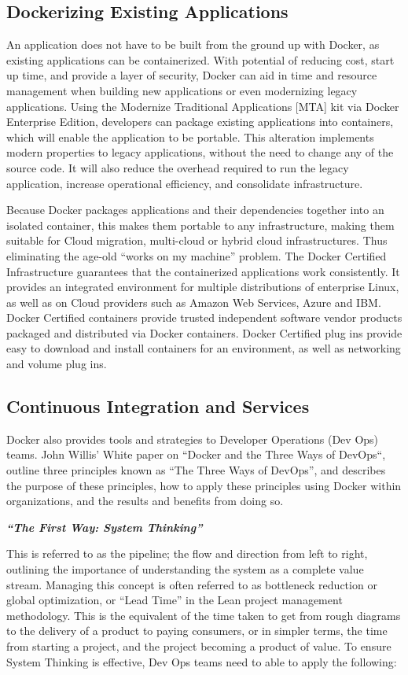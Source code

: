 \subsection{Dockerizing Existing Applications}
An application does not have to be built from the ground up with Docker, as existing applications  can be containerized. With potential of reducing cost, start up time, and provide a layer of security, Docker can aid in time and resource management when building new applications or even modernizing legacy applications. Using the Modernize Traditional Applications [MTA] kit via Docker Enterprise Edition, developers can package existing applications into containers, which will enable the application to be portable. This alteration implements modern properties to legacy applications, without the need to change any of the source code. It will also reduce the overhead required to run the legacy application, increase operational efficiency, and consolidate infrastructure.

Because Docker packages applications and their dependencies together into an isolated container, this makes them portable to any infrastructure, making them suitable for Cloud migration, multi-cloud or hybrid cloud infrastructures. Thus eliminating the age-old “works on my machine” problem. The Docker Certified Infrastructure guarantees that the containerized applications work consistently. It provides an integrated environment for multiple distributions of enterprise Linux, as well as on Cloud providers such as Amazon Web Services, Azure and IBM. Docker Certified containers provide trusted independent software vendor products packaged and distributed via Docker containers. Docker Certified plug ins provide easy to download and install containers for an environment, as well as networking and volume plug ins.

\subsection{Continuous Integration and Services}
Docker also provides tools and strategies to Developer Operations (Dev Ops) teams. John Willis’ White paper on “Docker and the Three Ways of DevOps“, outline three principles known as “The Three Ways of DevOps”, and describes the purpose of these principles, how to apply these principles using Docker within organizations, and the results and benefits from doing so. 

\textbf{\emph{“The First Way: System Thinking”}}

This is referred to as the pipeline; the flow and direction from left to right, outlining the importance of understanding the system as a complete value stream. Managing this concept is often referred to as bottleneck reduction or global optimization, or “Lead Time” in the Lean project management methodology\cite{willis}. This is the equivalent of the time taken to get from rough diagrams to the delivery of a product to paying consumers, or in simpler terms, the time from starting a project, and the project becoming a product of value\cite{willis}.  To ensure System Thinking is effective, Dev Ops teams need to able to apply the following:

